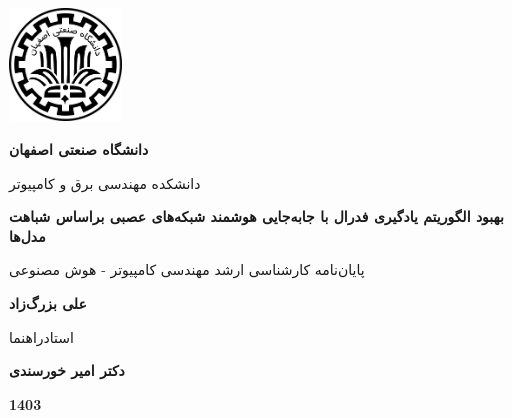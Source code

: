 \thispagestyle{empty}
\begin{center}
\includegraphics[height=3cm]{iut_logo.png}
\vspace{0.4cm}

\textbf{دانشگاه صنعتی اصفهان}\\
\vspace{0.4cm}

{\large

	دانشکده مهندسی برق و کامپیوتر
}
\vspace{3.5cm}

{\LARGE
	\textbf{
	بهبود الگوریتم یادگیری فدرال با جابه‌جایی هوشمند شبکه‌های عصبی براساس شباهت مدل‌ها
	}
	\\
}
\vspace{3.5cm}

{\large
	پایان‌نامه کارشناسی ارشد مهندسی کامپیوتر - هوش مصنوعی
}
\vspace{1cm}

{\Large
	\textbf{علی بزرگ‌زاد}\\
}
\vspace{2.5cm}

{\large
	استادراهنما\\
}
\vspace{0.5cm}

{\Large
	\textbf{دکتر امیر خورسندی}\\
}
\vspace{3.34cm}

\textbf{1403}

\end{center}
\restoregeometry
\pagebreak

